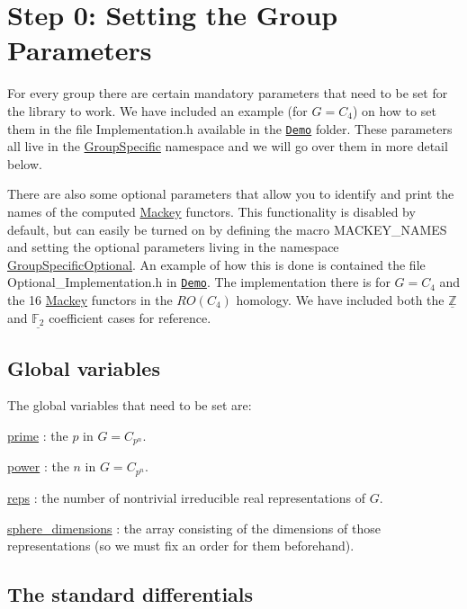 \hypertarget{use_how}{}\section{Step 0\+: Setting the Group Parameters}\label{use_how}

\begin{DoxyItemize}
\item For every group there are certain mandatory parameters that need to be set for the library to work. We have included an example (for $G=C_4$) on how to set them in the file {\ttfamily Implementation.\+h} available in the \href{https://github.com/NickG-Math/Mackey/tree/master/Demo}{\tt Demo} folder. These parameters all live in the \hyperlink{namespaceGroupSpecific}{Group\+Specific} namespace and we will go over them in more detail below.
\item There are also some optional parameters that allow you to identify and print the names of the computed \hyperlink{namespaceMackey}{Mackey} functors. This functionality is disabled by default, but can easily be turned on by defining the macro M\+A\+C\+K\+E\+Y\+\_\+\+N\+A\+M\+ES and setting the optional parameters living in the namespace \hyperlink{namespaceGroupSpecificOptional}{Group\+Specific\+Optional}. An example of how this is done is contained the file {\ttfamily Optional\+\_\+\+Implementation.\+h} in \href{https://github.com/NickG-Math/Mackey/tree/master/Demo}{\tt Demo}. The implementation there is for $G=C_4$ and the 16 \hyperlink{namespaceMackey}{Mackey} functors in the $RO(C_4)$ homology. We have included both the $\underline{\mathbb Z}$ and $\underline{\mathbb F_2}$ coefficient cases for reference.
\end{DoxyItemize}\hypertarget{use_var}{}\subsection{Global variables}\label{use_var}
The global variables that need to be set are\+:


\begin{DoxyItemize}
\item \hyperlink{classGroupSpecific_1_1Variables_a38586ec998bcbfdf325e6cfc6598b54b}{prime} \+: the $p$ in $G=C_{p^n}$.
\item \hyperlink{classGroupSpecific_1_1Variables_ac9bd6be19cc41e6877ee25a2d1c7be80}{power} \+: the $n$ in $G=C_{p^n}$.
\item \hyperlink{classGroupSpecific_1_1Variables_a5504789b0b60050e6ea223fdeb84874a}{reps} \+: the number of nontrivial irreducible real representations of $G$.
\item \hyperlink{classGroupSpecific_1_1Variables_a4746f16736abcf4c705dd8690ec12ca0}{sphere\+\_\+dimensions} \+: the array consisting of the dimensions of those representations (so we must fix an order for them beforehand).
\end{DoxyItemize}\hypertarget{use_fun}{}\subsection{The standard differentials}\label{use_fun}

